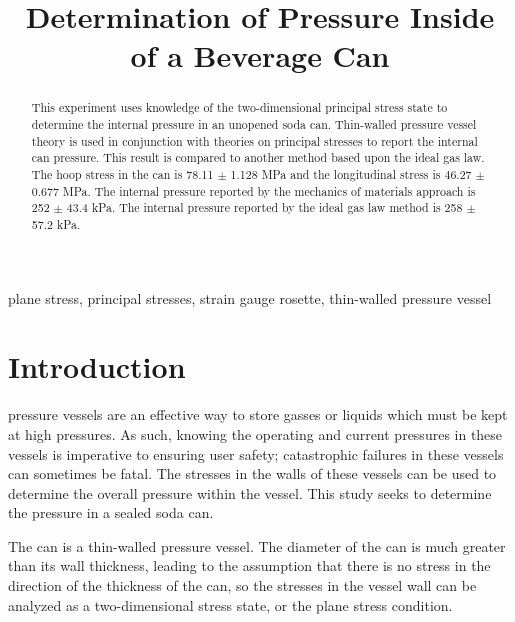 \documentclass[10pt,journal,letterpaper]{IEEEtran}
\begin{document}
\title{Determination of Pressure Inside of a Beverage Can}

\author{
}

\maketitle
\thispagestyle{empty}

\begin{abstract}
This experiment uses knowledge of the two-dimensional principal stress state to determine the internal pressure in an unopened soda can.
Thin-walled pressure vessel theory is used in conjunction with theories on principal stresses to report the internal can pressure.
This result is compared to another method based upon the ideal gas law.
The hoop stress in the can is 78.11 $\pm$ 1.128 MPa and the longitudinal stress is 46.27 $\pm$ 0.677 MPa.
The internal pressure reported by the mechanics of materials approach is 252 $\pm$ 43.4 kPa.
The internal pressure reported by the ideal gas law method is 258 $\pm$ 57.2 kPa.
\end{abstract}

\begin{IEEEkeywords}
plane stress, principal stresses, strain gauge rosette, thin-walled pressure vessel
\end{IEEEkeywords}

\section{Introduction}
 pressure vessels are an effective way to store gasses or liquids which must be kept at high pressures.
As such, knowing the operating and current pressures in these vessels is imperative to ensuring user safety; catastrophic failures in these vessels can sometimes be fatal.
The stresses in the walls of these vessels can be used to determine the overall pressure within the vessel.
This study seeks to determine the pressure in a sealed soda can.

The can is a thin-walled pressure vessel.
The diameter of the can is much greater than its wall thickness, leading to the assumption that there is no stress in the direction of the thickness of the can, so the stresses in the vessel wall can be analyzed as a two-dimensional stress state, or the plane stress condition.
\end{document}

